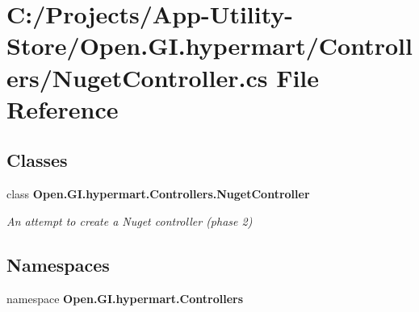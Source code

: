\section{C\+:/\+Projects/\+App-\/\+Utility-\/\+Store/\+Open.G\+I.\+hypermart/\+Controllers/\+Nuget\+Controller.cs File Reference}
\label{_nuget_controller_8cs}
\subsection*{Classes}
\begin{DoxyCompactItemize}
\item 
class \textbf{ Open.\+G\+I.\+hypermart.\+Controllers.\+Nuget\+Controller}
\begin{DoxyCompactList}\small\item\em An attempt to create a Nuget controller (phase 2) \end{DoxyCompactList}\end{DoxyCompactItemize}
\subsection*{Namespaces}
\begin{DoxyCompactItemize}
\item 
namespace \textbf{ Open.\+G\+I.\+hypermart.\+Controllers}
\end{DoxyCompactItemize}
